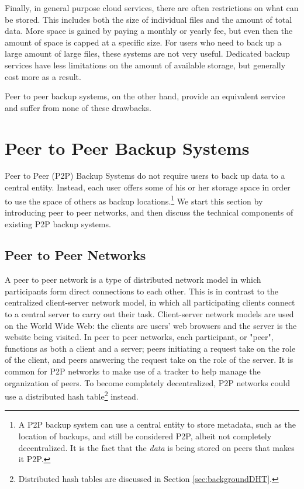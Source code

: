 \documentclass[12pt]{report}
\begin{document}
Finally, in general purpose cloud services, there are often restrictions on what can be stored. This includes both the size of individual files and the amount of total data. More space is gained by paying a monthly or yearly fee, but even then the amount of space is capped at a specific size. For users who need to back up a large amount of large files, these systems are not very useful. Dedicated backup services have less limitations on the amount of available storage, but generally cost more as a result.

Peer to peer backup systems, on the other hand, provide an equivalent service and suffer from none of these drawbacks.

\section{Peer to Peer Backup Systems}

Peer to Peer (P2P) Backup Systems do not require users to back up data to a central entity. Instead, each user offers some of his or her storage space in order to use the space of others as backup locations.\footnote{A P2P backup system can use a central entity to store metadata, such as the location of backups, and still be considered P2P, albeit not completely decentralized. It is the fact that the \emph{data} is being stored on peers that makes it P2P.} We start this section by introducing peer to peer networks, and then discuss the technical components of existing P2P backup systems.

\subsection{Peer to Peer Networks} \label{subsec:PeertoPeerNetworks}

A peer to peer network is a type of distributed network model in which participants form direct connections to each other. This is in contrast to the centralized client-server network model, in which all participating clients connect to a central server to carry out their task. Client-server network models are used on the World Wide Web: the clients are users' web browsers and the server is the website being visited. In peer to peer networks, each participant, or "peer", functions as both a client and a server; peers initiating a request take on the role of the client, and peers answering the request take on the role of the server. It is common for P2P networks to make use of a tracker to help manage the organization of peers. To become completely decentralized, P2P networks could use a distributed hash table\footnote{Distributed hash tables are discussed in Section \ref{sec:backgroundDHT}.} instead.
\end{document}
